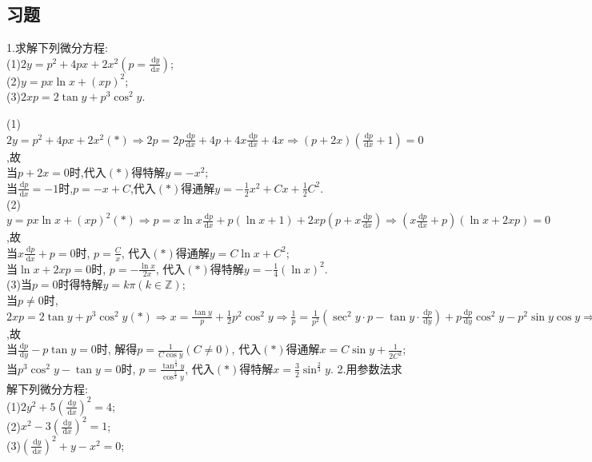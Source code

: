 \documentclass[titlepage,11pt,a4paper,twoside]{report}
\makeatletter
\newcommand\diff{\,\mathrm{d}}
\renewenvironment{proof}{\par
	\pushQED{\qed}%
	\normalfont \topsep1\p@\@plus6\p@\relax
	\trivlist
	\item\relax
	{\hspace*{\parindent}{\heiti 证明}\@addpunct{:}}\hspace\labelsep\ignorespaces
}{%
	\popQED\endtrivlist\@endpefalse
}
\makeatother
\begin{document}
\subsection{习题}
1.求解下列微分方程:\\
(1)$\displaystyle 2y=p^2+4px+2x^2\left(p=\frac{\diff y}{\diff x}\right)$;\\
(2)$\displaystyle y=px\ln x+(xp)^2$;\\
(3)$\displaystyle 2xp=2\tan y+p^3\cos^2y$.
\begin{proof}
(1)$\displaystyle 2y=p^2+4px+2x^2(*)
\Rightarrow2p=2p\frac{\diff p}{\diff x}+4p+4x\frac{\diff p}{\diff x}+4x\Rightarrow(p+2x)\left(\frac{\diff p}{\diff x}+1\right)=0$,故\\
当$p+2x=0$时,代入$(*)$得特解$y=-x^2$;\\
当$\frac{\diff p}{\diff x}=-1$时,$p=-x+C$,代入$(*)$得通解$y=-\frac{1}{2}x^2+Cx+\frac{1}{2}C^2$.\\
(2)$\displaystyle y=px\ln x+(xp)^2(*)\Rightarrow p=x\ln x\frac{\diff p}{\diff x}+p(\ln x+1)+2xp\left(p+x\frac{\diff p}{\diff x}\right)\Rightarrow\left(x\frac{\diff p}{\diff x}+p\right)(\ln x+2xp)=0$,故\\
当$x\frac{\diff p}{\diff x}+p=0$时, $p=\frac{C}{x}$, 代入$(*)$得通解$y=C\ln x+C^2$;\\
当$\ln x+2xp=0$时, $p=-\frac{\ln x}{2x}$, 代入$(*)$得特解$y=-\frac{1}{4}(\ln x)^2$.\\
(3)当$p=0$时得特解$y=k\pi(k\in\mathbb{Z})$;\\
当$p\neq0$时,$\displaystyle2xp=2\tan y+p^3\cos^2y(*)\Rightarrow x=\frac{\tan y}{p}+\frac{1}{2}p^2\cos^2y\Rightarrow\frac{1}{p}=\frac{1}{p^2}\left(\sec^2y\cdot p-\tan y\cdot\frac{\diff p}{\diff y}\right)+p\frac{\diff p}{\diff y}\cos^2y-p^2\sin y\cos y\Rightarrow\left(\frac{\diff p}{\diff y}-p\tan y\right)\left(p^3\cos^2y-\tan y\right)=0$,故\\
当$\frac{\diff p}{\diff y}-p\tan y=0$时, 解得$p=\frac{1}{C\cos y}(C\neq0)$, 代入$(*)$得通解$x=C\sin y+\frac{1}{2C^2}$;\\
当$p^3\cos^2y-\tan y=0$时, $p=\frac{\tan^{\frac{1}{3}}y}{\cos^{\frac{2}{3}}y}$, 代入$(*)$得特解$x=\frac{3}{2}\sin^{\frac{2}{3}}y$.
\end{proof}
2.用参数法求解下列微分方程:\\
(1)$\displaystyle 2y^2+5\left(\frac{\diff y}{\diff x}\right)^2=4$;\\
(2)$\displaystyle x^2-3\left(\frac{\diff y}{\diff x}\right)^2=1$;\\
(3)$\displaystyle\left(\frac{\diff y}{\diff x}\right)^2+y-x^2=0$;\\
\end{document}
